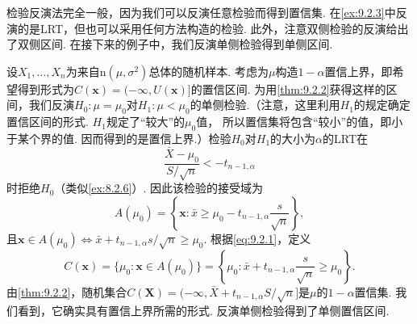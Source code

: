 检验反演法完全一般，因为我们可以反演任意检验而得到置信集. 在\autoref{ex:9.2.3}中反演的是LRT，但也可以采用任何方法构造的检验. 此外，注意双侧检验的反演给出了双侧区间. 在接下来的例子中，我们反演单侧检验得到单侧区间.
\begin{example}[正态单侧置信界]\label{ex:9.2.4}
设$X_1,\ldots,X_n$为来自$\mathrm n(\mu,\sigma^2)$总体的随机样本. 考虑为$\mu$构造$1-\alpha$置信上界，即希望得到形式为$C(\boldsymbol x)=(-\infty,U(\boldsymbol x)]$的置信区间. 为用\autoref{thm:9.2.2}获得这样的区间，我们反演$H_0:\mu=\mu_0$对$H_1:\mu<\mu_0$的单侧检验.（注意，这里利用$H_1$的规定确定置信区间的形式. $H_1$规定了“较大”的$\mu_0$值，
所以置信集将包含“较小”的值，即小于某个界的值. 因而得到的是置信上界.）检验$H_0$对$H_1$的大小为$\alpha$的LRT在
$$\frac{\bar X-\mu_0}{S/\sqrt n}<-t_{n-1,\alpha}$$
时拒绝$H_0$（类似\autoref{ex:8.2.6}）. 因此该检验的接受域为
$$A(\mu_0)=\left\{\boldsymbol x:\bar x\ge\mu_0-t_{n-1,\alpha}\frac s{\sqrt n}\right\},$$
且$\boldsymbol x\in A(\mu_0)\iff\bar x+t_{n-1,\alpha}s/\sqrt n\ge\mu_0$. 根据\eqref{eq:9.2.1}，定义
$$C(\boldsymbol x)=\{\mu_0:\boldsymbol x\in A(\mu_0)\}=\left\{\mu_0:\bar x+t_{n-1,\alpha}\frac s{\sqrt n}\ge\mu_0\right\}.$$
由\autoref{thm:9.2.2}，随机集合$C(\boldsymbol X)=(-\infty,\bar X+t_{n-1,\alpha}S/\sqrt n]$是$\mu$的$1-\alpha$置信集. 我们看到，它确实具有置信上界所需的形式. 反演单侧检验得到了单侧置信区间.
\end{example}
